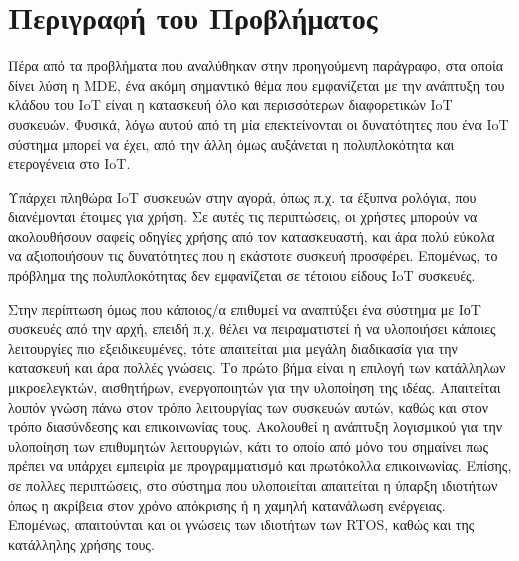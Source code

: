 \section{Περιγραφή του Προβλήματος}
\label{section:problem_description}

Πέρα από τα προβλήματα που αναλύθηκαν στην προηγούμενη παράγραφο, στα οποία δίνει λύση η MDE, ένα ακόμη σημαντικό θέμα που εμφανίζεται με την ανάπτυξη του κλάδου του IoT είναι η κατασκευή όλο και περισσότερων διαφορετικών IoT συσκευών. Φυσικά, λόγω αυτού από τη μία επεκτείνονται οι δυνατότητες που ένα IoT σύστημα μπορεί να έχει, από την άλλη όμως αυξάνεται η πολυπλοκότητα και ετερογένεια στο IoT.

Υπάρχει πληθώρα IoT συσκευών στην αγορά, όπως π.χ. τα έξυπνα ρολόγια, που διανέμονται έτοιμες για χρήση. Σε αυτές τις περιπτώσεις, οι χρήστες μπορούν να ακολουθήσουν σαφείς οδηγίες χρήσης από τον κατασκευαστή, και άρα πολύ εύκολα να αξιοποιήσουν τις δυνατότητες που η εκάστοτε συσκευή προσφέρει. Επομένως, το πρόβλημα της πολυπλοκότητας δεν εμφανίζεται σε τέτοιου είδους IoT συσκευές.

Στην περίπτωση όμως που κάποιος/α επιθυμεί να αναπτύξει ένα σύστημα με ΙοΤ συσκευές από την αρχή, επειδή π.χ. θέλει να πειραματιστεί ή να υλοποιήσει κάποιες λειτουργίες πιο εξειδικευμένες, τότε απαιτείται μια μεγάλη διαδικασία για την κατασκευή και άρα πολλές γνώσεις. Το πρώτο βήμα είναι η επιλογή των κατάλληλων μικροελεγκτών, αισθητήρων, ενεργοποιητών για την υλοποίηση της ιδέας. Απαιτείται λοιπόν γνώση πάνω στον τρόπο λειτουργίας των συσκευών αυτών, καθώς και στον τρόπο διασύνδεσης και επικοινωνίας τους. Ακολουθεί η ανάπτυξη λογισμικού για την υλοποίηση των επιθυμητών λειτουργιών, κάτι το οποίο από μόνο του σημαίνει πως πρέπει να υπάρχει εμπειρία με προγραμματισμό και πρωτόκολλα επικοινωνίας. Επίσης, σε πολλες περιπτώσεις, στο σύστημα που υλοποιείται απαιτείται η ύπαρξη ιδιοτήτων όπως η ακρίβεια στον χρόνο απόκρισης ή η χαμηλή κατανάλωση ενέργειας. Επομένως, απαιτούνται και οι γνώσεις των ιδιοτήτων των RTOS, καθώς και της κατάλληλης χρήσης τους.
